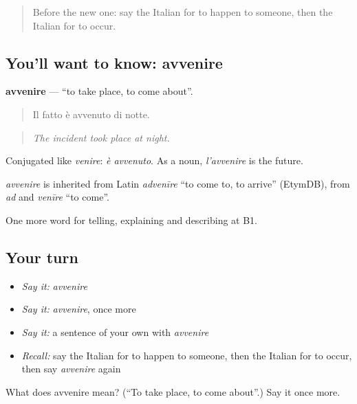 \begin{quote}
Before the new one: say the Italian for to happen to someone, then the Italian for to occur.
\end{quote}

\subsection*{You'll want to know: avvenire}
\textbf{avvenire} — \textquotedblleft{}to take place, to come about\textquotedblright{}.

\begin{quote}
Il fatto è avvenuto di notte.
\end{quote}

\begin{quote}
\emph{The incident took place at night.}
\end{quote}

Conjugated like \emph{venire}: \emph{è avvenuto}. As a noun, \emph{l'avvenire} is the future.

\begin{cousinweb}
\emph{avvenire} is inherited from Latin \emph{advenīre} \textquotedblleft{}to come to, to arrive\textquotedblright{} (EtymDB), from \emph{ad} and \emph{venīre} \textquotedblleft{}to come\textquotedblright{}.
\end{cousinweb}

\begin{grammarlens}[title={What you've built}]
One more word for telling, explaining and describing at B1.
\end{grammarlens}

\subsection*{Your turn}
\begin{itemize}
\raggedright
  \item \emph{Say it:} \emph{avvenire}
  \item \emph{Say it:} \emph{avvenire}, once more
  \item \emph{Say it:} a sentence of your own with \emph{avvenire}
  \item \emph{Recall:} say the Italian for to happen to someone, then the Italian for to occur, then say \emph{avvenire} again
\end{itemize}

\begin{tcolorbox}[breakable,colback=teal!4,colframe=teal!35!black,title={Before you move on}]
What does avvenire mean? (\textquotedblleft{}To take place, to come about\textquotedblright{}.) Say it once more.
\end{tcolorbox}
